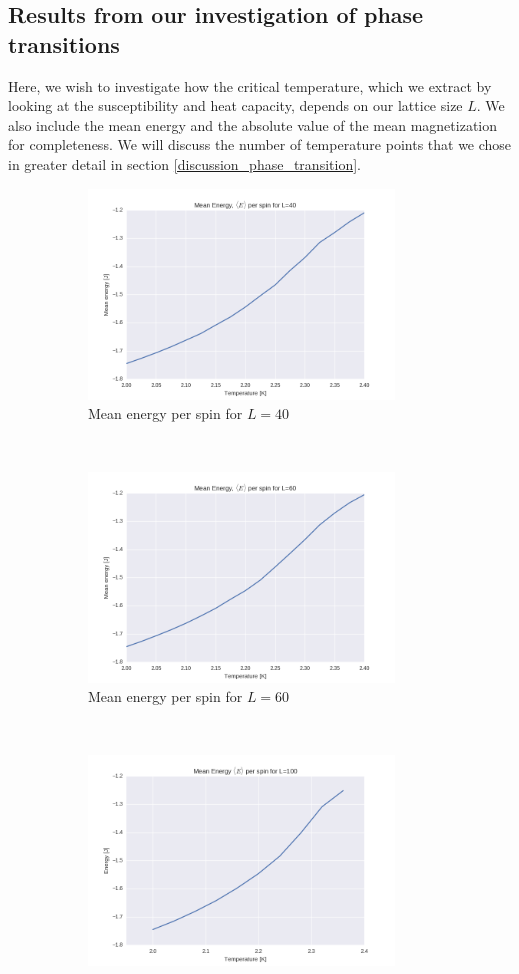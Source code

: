 \documentclass[a4paper, 10pt]{article}
\begin{document}
\subsection{Results from our investigation of phase transitions}
Here, we wish to investigate how the critical temperature, which we extract by looking at the susceptibility and heat capacity, depends on our lattice size $L$. We also include the mean energy and the absolute value of the mean magnetization for completeness. We will discuss the number of temperature points that we chose in greater detail in section \ref{discussion_phase_transition}.\\
\clearpage
\begin{figure}[!ht]
    \centering
    \begin{subfigure}[H!]{0.5\textwidth}
        \centering
        \includegraphics[height=2.2in]{meanEnergyl40Ne5New.png}
        \caption{Mean energy per spin for $L=40$}
    \end{subfigure}%
    ~ 
    \begin{subfigure}[H!]{0.5\textwidth}
        \centering
        \includegraphics[height=2.2in]{meanEnergyl60Ne5New.png}
        \caption{Mean energy per spin for $L=60$}
    \end{subfigure}
        ~
     \begin{subfigure}[H!]{0.5\textwidth}
        \centering
        \includegraphics[height=2.2in]{meanEnergyl100Ne5New.png}

\end{subfigure}
\end{figure}
\end{document}
